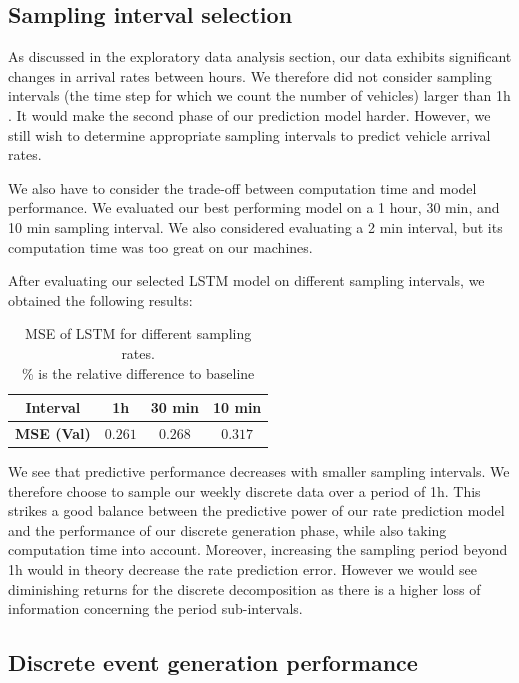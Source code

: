\documentclass[10pt,conference,compsocconf]{IEEEtran}
\begin{document}
\subsection{Sampling interval selection}

As discussed in the exploratory data analysis section, our data exhibits significant changes in arrival
rates between hours.  We therefore did not consider sampling intervals (the time step for which we count the number of vehicles) larger than 1h . It would make the second phase of our prediction model harder. However, we still 
wish to determine appropriate sampling intervals to predict vehicle arrival rates. 

We also have to consider the trade-off between computation time and model performance. We evaluated our
best performing model on a 1 hour, 30 min, and 10 min sampling interval. We also considered evaluating a
2 min interval, but its computation time was too great on our machines.

After evaluating our selected LSTM model on different sampling intervals, we obtained the following results:

\begin{table}[h!]
\begin{center}
\begin{tabular}{| c| c c c | }
\hline
 \textbf{Interval}   & 1h & 30 min & 10 min \\
 \hline
 \textbf{MSE (Val)} & $0.261$ & $0.268$ & $0.317$ \\
 \hline
\end{tabular}
\end{center}
\label{table:sampling}
\caption{MSE of LSTM for different sampling rates.\\
{\footnotesize \% is the relative difference to baseline}}
\end{table}

We see that predictive performance decreases with smaller sampling intervals. We therefore choose to sample our
weekly discrete data over a period of 1h. This strikes a good balance between the predictive power of our rate
prediction model and the performance of our discrete generation phase, while also taking computation time into account. Moreover, increasing the sampling period beyond 1h would in theory decrease the rate prediction error. However we would see diminishing returns for the discrete decomposition as there is a higher loss of information concerning the period sub-intervals. 

\subsection{Discrete event generation performance}
\end{document}
